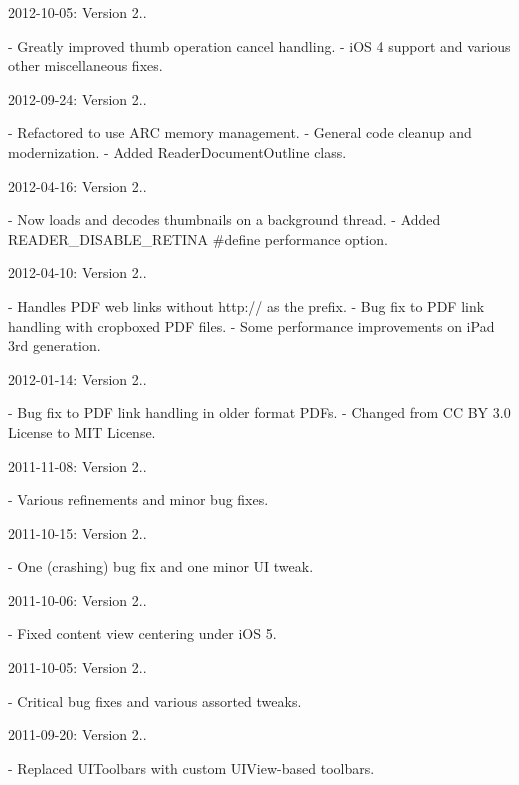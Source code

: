 2012-\/10-\/05\-: Version 2.. \begin{DoxyVerb}- Greatly improved thumb operation cancel handling.
- iOS 4 support and various other miscellaneous fixes.
\end{DoxyVerb}


2012-\/09-\/24\-: Version 2.. \begin{DoxyVerb}- Refactored to use ARC memory management.
- General code cleanup and modernization.
- Added ReaderDocumentOutline class.
\end{DoxyVerb}


2012-\/04-\/16\-: Version 2.. \begin{DoxyVerb}- Now loads and decodes thumbnails on a background thread.
- Added READER_DISABLE_RETINA #define performance option.
\end{DoxyVerb}


2012-\/04-\/10\-: Version 2.. \begin{DoxyVerb}- Handles PDF web links without http:// as the prefix.
- Bug fix to PDF link handling with cropboxed PDF files.
- Some performance improvements on iPad 3rd generation.
\end{DoxyVerb}


2012-\/01-\/14\-: Version 2.. \begin{DoxyVerb}- Bug fix to PDF link handling in older format PDFs.
- Changed from CC BY 3.0 License to MIT License.
\end{DoxyVerb}


2011-\/11-\/08\-: Version 2.. \begin{DoxyVerb}- Various refinements and minor bug fixes.
\end{DoxyVerb}


2011-\/10-\/15\-: Version 2.. \begin{DoxyVerb}- One (crashing) bug fix and one minor UI tweak.
\end{DoxyVerb}


2011-\/10-\/06\-: Version 2.. \begin{DoxyVerb}- Fixed content view centering under iOS 5.
\end{DoxyVerb}


2011-\/10-\/05\-: Version 2.. \begin{DoxyVerb}- Critical bug fixes and various assorted tweaks.
\end{DoxyVerb}


2011-\/09-\/20\-: Version 2.. \begin{DoxyVerb}- Replaced UIToolbars with custom UIView-based toolbars.
\end{DoxyVerb}


